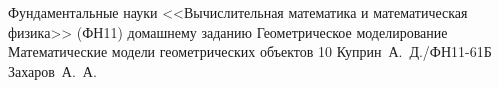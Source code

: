 \documentclass{bmstu}
\begin{document}
	\makereporttitle
	{Фундаментальные науки}
	{<<Вычислительная математика и математическая физика>> (ФН11)}
	{домашнему заданию}
	{Геометрическое моделирование}
	{Математические модели геометрических объектов}
	{10}
	{Куприн~А.~Д./ФН11-61Б}
	{Захаров~А.~А.}

	\maketableofcontents

	
	
	
	
	\makebibliography
\end{document}
